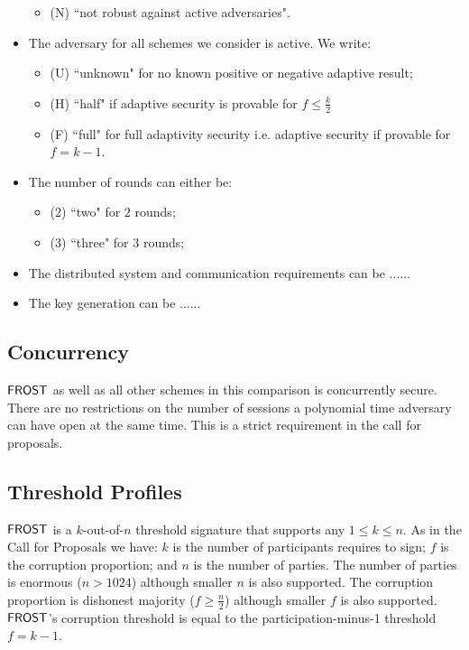 \begin{itemize}
\begin{itemize}
 			\item (N) ``not robust against active adversaries".
 		\end{itemize}
 	\item The adversary for all schemes we consider is active.  We write:
 		\begin{itemize}
 			\item (U)  ``unknown" for no known positive or negative adaptive result;
 			\item (H) ``half" if adaptive security is provable for $f \leq \frac{k}{2}$
 			\item (F) ``full" for full adaptivity security i.e. adaptive security if provable for $f = k - 1$.
 		\end{itemize}
 	\item The number of rounds  can either be:
 	\begin{itemize}
 		\item (2) ``two" for $2$ rounds;
 		\item (3) ``three" for $3$ rounds;
 	\end{itemize}
 	\item The distributed system and communication requirements can be ......
 	\item The key generation can be ......
\end{itemize}

\subsection{Concurrency}\label{section:comparisons:concurrency}
$\mathsf{FROST}$ as well as all other schemes in this comparison is concurrently secure.
There are no restrictions on the number of sessions a polynomial time adversary can have open at the same time.
This is a strict requirement in the call for proposals.

\subsection{Threshold Profiles}
$\mathsf{FROST}$ is a $k$-out-of-$n$ threshold signature that supports any $1 \leq k \leq n$.
As in the Call for Proposals \cite{} we have: $k$ is the number of participants requires to sign; $f$ is the corruption proportion; and  $n$ is the number of parties.
The number of parties is enormous ($n > 1024$) although smaller $n$ is also supported.
The corruption proportion is dishonest majority ($f \geq \frac{n}{2}$) although smaller $f$ is also supported.
$\mathsf{FROST}$'s corruption threshold is equal to the participation-minus-1 threshold $f = k-1$.


